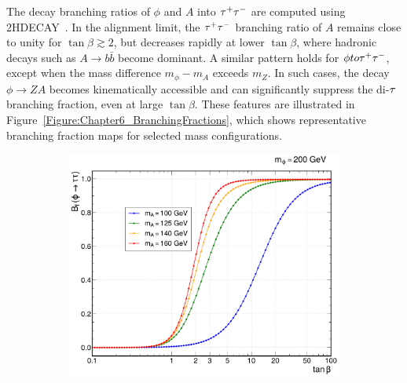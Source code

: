 The decay branching ratios of $\phi$ and $A$ into $\tau^+\tau^-$ are computed using \textsc{2HDECAY}~\cite{2HDECAY}. In the alignment limit, the $\tau^+\tau^-$ branching ratio of $A$ remains close to unity for $\tan\beta \gtrsim 2$, but decreases rapidly at lower $\tan\beta$, where hadronic decays such as $A \to b\bar{b}$ become dominant. A similar pattern holds for $\phi to \tau^+\tau^-$, except when the mass difference $m_\phi - m_A$ exceeds $m_Z$. In such cases, the decay $\phi \to ZA$ becomes kinematically accessible and can significantly suppress the di-$\tau$ branching fraction, even at large $\tan\beta$. These features are illustrated in Figure~\ref{Figure:Chapter6_BranchingFractions}, which shows representative branching fraction maps for selected mass configurations. 

\begin{figure}[h]
        \centering
        \begin{subfigure}[b]{0.49\textwidth}
            \centering
            \includegraphics[width=\textwidth]{Figures/Chapter6/Phi_BR.pdf}
            \caption{}
        \end{subfigure}
        \begin{subfigure}[b]{0.49\textwidth}
            \centering

\end{subfigure}
\end{figure}
